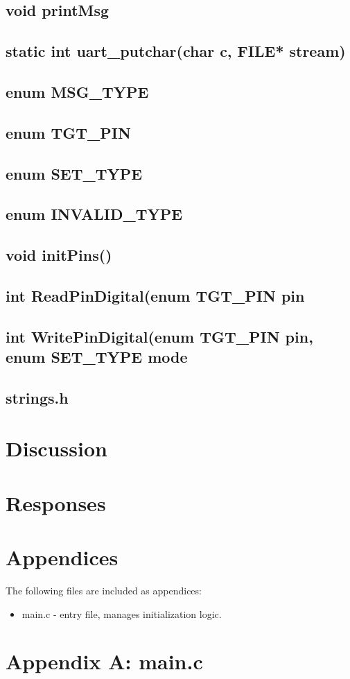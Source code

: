 \documentclass[letterpaper,11pt]{texMemo} %
\begin{document}
\subsection*{void printMsg}
\subsection*{static int uart_putchar(char c, FILE* stream)}
\subsection*{enum MSG_TYPE}
\subsection*{enum TGT_PIN}
\subsection*{enum SET_TYPE}
\subsection*{enum INVALID_TYPE}
\subsection*{void initPins()}
\subsection*{int ReadPinDigital(enum TGT_PIN pin}
\subsection*{int WritePinDigital(enum TGT_PIN pin, enum SET_TYPE mode}
\subsection*{strings.h}

\section*{Discussion}


\newpage
\section*{Responses}


\section*{Appendices}
The following files are included as appendices:
\begin{itemize}
\item main.c - entry file, manages initialization logic.
\end{itemize}
\newpage

\section*{Appendix A: main.c}
\begin{tiny}

\end{tiny}
\newpage
\end{document}
